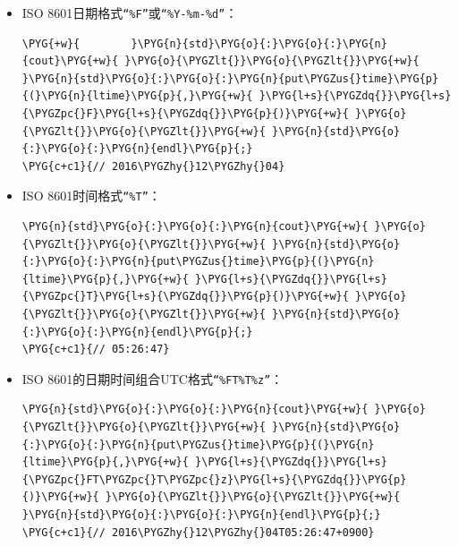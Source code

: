 \begin{itemize}
\item ISO 8601日期格式\texttt{“\%F”}或\texttt{“\%Y-\%m-\%d”}：



\begin{codeblockbg}
\begin{Verbatim}[commandchars=\\\{\},breaklines=true,breakanywhere=true,fontsize=\codefont,xleftmargin=17bp]
\PYG{+w}{        }\PYG{n}{std}\PYG{o}{:}\PYG{o}{:}\PYG{n}{cout}\PYG{+w}{ }\PYG{o}{\PYGZlt{}}\PYG{o}{\PYGZlt{}}\PYG{+w}{ }\PYG{n}{std}\PYG{o}{:}\PYG{o}{:}\PYG{n}{put\PYGZus{}time}\PYG{p}{(}\PYG{n}{ltime}\PYG{p}{,}\PYG{+w}{ }\PYG{l+s}{\PYGZdq{}}\PYG{l+s}{\PYGZpc{}F}\PYG{l+s}{\PYGZdq{}}\PYG{p}{)}\PYG{+w}{ }\PYG{o}{\PYGZlt{}}\PYG{o}{\PYGZlt{}}\PYG{+w}{ }\PYG{n}{std}\PYG{o}{:}\PYG{o}{:}\PYG{n}{endl}\PYG{p}{;}
\PYG{c+c1}{// 2016\PYGZhy{}12\PYGZhy{}04}
\end{Verbatim}
\end{codeblockbg}



\item ISO 8601时间格式\texttt{“\%T”}：



\begin{codeblockbg}
\begin{Verbatim}[commandchars=\\\{\},breaklines=true,breakanywhere=true,fontsize=\codefont,xleftmargin=17bp]
\PYG{n}{std}\PYG{o}{:}\PYG{o}{:}\PYG{n}{cout}\PYG{+w}{ }\PYG{o}{\PYGZlt{}}\PYG{o}{\PYGZlt{}}\PYG{+w}{ }\PYG{n}{std}\PYG{o}{:}\PYG{o}{:}\PYG{n}{put\PYGZus{}time}\PYG{p}{(}\PYG{n}{ltime}\PYG{p}{,}\PYG{+w}{ }\PYG{l+s}{\PYGZdq{}}\PYG{l+s}{\PYGZpc{}T}\PYG{l+s}{\PYGZdq{}}\PYG{p}{)}\PYG{+w}{ }\PYG{o}{\PYGZlt{}}\PYG{o}{\PYGZlt{}}\PYG{+w}{ }\PYG{n}{std}\PYG{o}{:}\PYG{o}{:}\PYG{n}{endl}\PYG{p}{;}
\PYG{c+c1}{// 05:26:47}
\end{Verbatim}
\end{codeblockbg}



\item ISO 8601的日期时间组合UTC格式\texttt{“\%FT\%T\%z”}：



\begin{codeblockbg}
\begin{Verbatim}[commandchars=\\\{\},breaklines=true,breakanywhere=true,fontsize=\codefont,xleftmargin=17bp]
\PYG{n}{std}\PYG{o}{:}\PYG{o}{:}\PYG{n}{cout}\PYG{+w}{ }\PYG{o}{\PYGZlt{}}\PYG{o}{\PYGZlt{}}\PYG{+w}{ }\PYG{n}{std}\PYG{o}{:}\PYG{o}{:}\PYG{n}{put\PYGZus{}time}\PYG{p}{(}\PYG{n}{ltime}\PYG{p}{,}\PYG{+w}{ }\PYG{l+s}{\PYGZdq{}}\PYG{l+s}{\PYGZpc{}FT\PYGZpc{}T\PYGZpc{}z}\PYG{l+s}{\PYGZdq{}}\PYG{p}{)}\PYG{+w}{ }\PYG{o}{\PYGZlt{}}\PYG{o}{\PYGZlt{}}\PYG{+w}{ }\PYG{n}{std}\PYG{o}{:}\PYG{o}{:}\PYG{n}{endl}\PYG{p}{;}
\PYG{c+c1}{// 2016\PYGZhy{}12\PYGZhy{}04T05:26:47+0900}
\end{Verbatim}
\end{codeblockbg}



\end{itemize}
